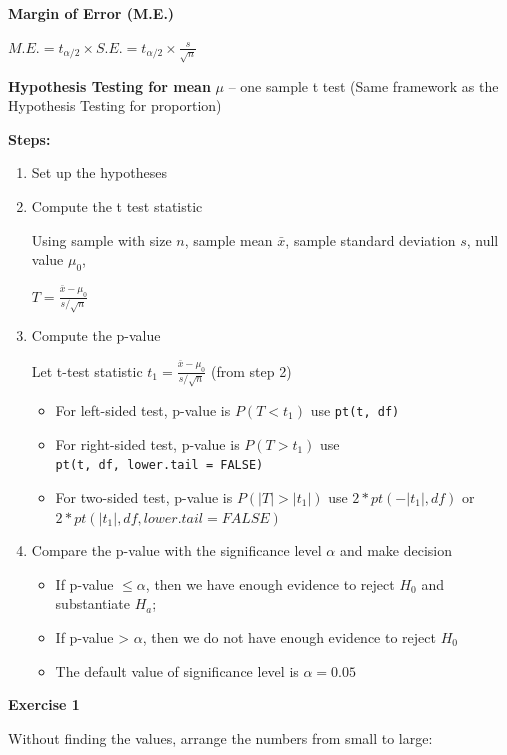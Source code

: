 \documentclass[
]{book}
\begin{document}
\textbf{Margin of Error (M.E.)}

\(M.E. = t_{\alpha/2} \times S.E. = t_{\alpha/2} \times \frac{s}{\sqrt{n}}\)

\textbf{Hypothesis Testing for mean} \(\mu\) -- one sample t test (Same framework as the Hypothesis Testing for proportion)

\textbf{Steps:}

\begin{enumerate}
\def\labelenumi{\arabic{enumi}.}
\item
  Set up the hypotheses
\item
  Compute the t test statistic

  Using sample with size \(n\), sample mean \(\bar{x}\), sample standard deviation \(s\), null value \(\mu_0\),

  \(T = \frac{\bar{x} - \mu_0}{s/\sqrt{n}}\)
\item
  Compute the p-value

  Let t-test statistic \(t_1 = \frac{\bar{x} - \mu_0}{s/\sqrt{n}}\) (from step 2)

  \begin{itemize}
  \item
    For left-sided test, p-value is \(P(T < t_1)\) use \texttt{pt(t,\ df)}
  \item
    For right-sided test, p-value is \(P(T > t_1)\) use \texttt{pt(t,\ df,\ lower.tail\ =\ FALSE)}
  \item
    For two-sided test, p-value is \(P(|T| > |t_1|)\) use \(2*pt(-|t_1|, df)\) or \(2*pt(|t_1|, df, lower.tail = FALSE)\)
  \end{itemize}
\item
  Compare the p-value with the significance level \(\alpha\) and make decision

  \begin{itemize}
  \item
    If p-value \(\leq \alpha\), then we have enough evidence to reject \(H_0\) and substantiate \(H_a\);
  \item
    If p-value \textgreater{} \(\alpha\), then we do not have enough evidence to reject \(H_0\)
  \item
    The default value of significance level is \(\alpha = 0.05\)
  \end{itemize}
\end{enumerate}

\textbf{Exercise 1}

Without finding the values, arrange the numbers from small to large:
\end{document}
